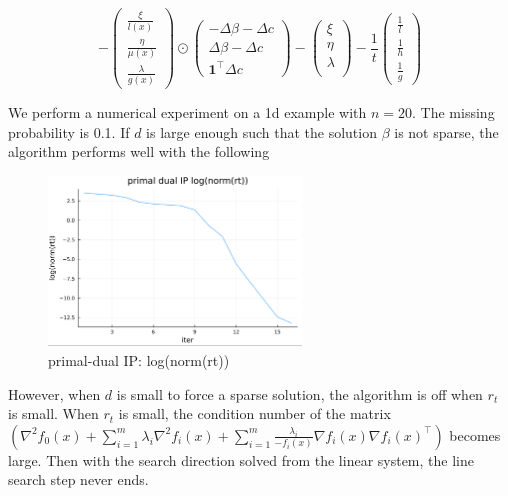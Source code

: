 \documentclass{article}
\begin{document}
 \begin{equation}
     -\left(\begin{array}{c}
\frac{\xi}{l(x)} \\
\frac{\eta}{\mu(x)} \\
\frac{\lambda}{g(x)}
\end{array}\right) \odot\left(\begin{array}{c}
-\Delta \beta-\Delta c \\
\Delta \beta-\Delta c \\
\boldsymbol{1}^{\top} \Delta c
\end{array}\right)-\left(\begin{array}{c}
\xi \\
\eta \\
\lambda \\
\end{array}\right)-\frac{1}{t}\left(\begin{array}{c}
\frac{1}{l} \\
\frac{1}{h} \\
\frac{1}{g}
\end{array}\right)
 \end{equation}

We perform a numerical experiment on a 1d example with $n=20$. The missing probability is 0.1. If $d$ is large enough such that the solution $\beta$ is not sparse, the algorithm performs well with the following 
\begin{figure}[H]
	\centering
\includegraphics[width=0.6\textwidth]{Interior Point Method/subgradplot2_fig/PDrnorm.png} 		  \caption{primal-dual IP: log(norm(rt))}
\end{figure}
However, when $d$ is small to force a sparse solution, the algorithm is off when $r_t$ is small. When $r_t$ is small, the condition number of the matrix $\left(\nabla^2 f_0(x)+\sum_{i=1}^m \lambda_i \nabla^2 f_i(x)+\sum_{i=1}^m \frac{\lambda_i}{-f_i(x)} \nabla f_i(x) \nabla f_i(x)^{\top}\right)$ becomes large. Then with the search direction solved from the linear system, the line search step never ends.
\end{document}
